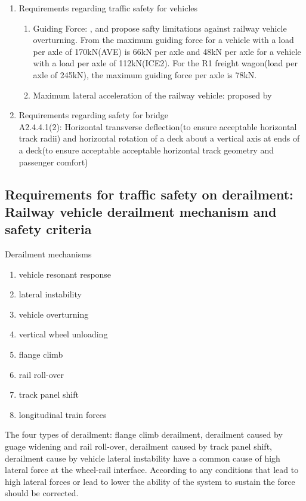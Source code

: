 \begin{enumerate}[-]
    \item Requirements regarding traffic safety for vehicles
    \begin{enumerate}
        \item Guiding Force: \cite{code2005518} , \cite{en200714363} and\cite{cuadrado2008analysis} propose safty limitations against railway vehicle overturning. From\cite{en200714363} the maximum guiding force for a vehicle with a load per axle of 170kN(AVE) is 66kN per axle and 48kN per axle for a vehicle with a load per axle of 112kN(ICE2). For the R1 freight wagon(load per axle of 245kN), the maximum guiding force per axle is 78kN.
        \item Maximum lateral acceleration of the railway vehicle: proposed by \cite{13803}
    \end{enumerate}
    \item Requirements regarding safety for bridge\\
    \cite{EC0} A2.4.4.1(2): Horizontal transverse deflection(to ensure acceptable horizontal track radii) and horizontal rotation of a deck about a vertical axis at ends of a deck(to ensure acceptable acceptable horizontal track geometry and passenger comfort)
\end{enumerate}


\subsection{Requirements for traffic safety on derailment: Railway vehicle derailment mechanism and safety criteria}

Derailment mechanisms
\begin{enumerate}
    \item vehicle resonant response
    \item lateral instability
    \item vehicle overturning
    \item vertical wheel unloading
    \item flange climb
    \item rail roll-over
    \item track panel shift
    \item longitudinal train forces
\end{enumerate}

The four types of derailment: flange climb derailment, derailment caused by guage widening and rail roll-over, derailment caused by track panel shift, derailment cause by vehicle lateral instability have a common cause of high lateral force at the wheel-rail interface. According to \cite[Chapter 8, IV]{iwnicki2006handbook} any conditions that lead to high lateral forces or lead to lower the ability of the system to sustain the force should be corrected. 

